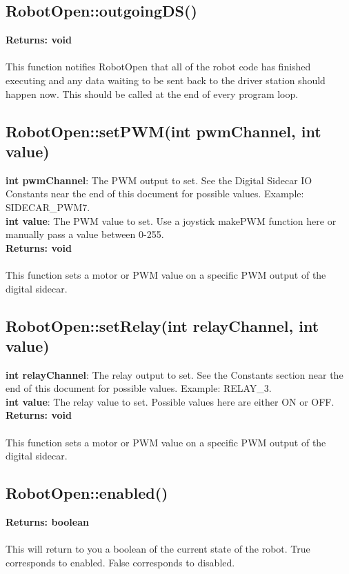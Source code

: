 \documentclass[11pt]{article} %
\begin{document}
\subsection{RobotOpen::outgoingDS()}
\textbf{Returns: void}\\\\
This function notifies RobotOpen that all of the robot code has finished executing and any data waiting to be sent back to the driver station should happen now. This should be called at the end of every program loop.
\subsection{RobotOpen::setPWM(int pwmChannel, int value)}
\textbf{int pwmChannel}: The PWM output to set. See the Digital Sidecar IO Constants near the end of this document for possible values. Example: SIDECAR\_PWM7.\\
\textbf{int value}: The PWM value to set. Use a joystick makePWM function here or manually pass a value between 0-255.\\
\textbf{Returns: void}\\\\
This function sets a motor or PWM value on a specific PWM output of the digital sidecar.
\subsection{RobotOpen::setRelay(int relayChannel, int value)}
\textbf{int relayChannel}: The relay output to set. See the Constants section near the end of this document for possible values. Example: RELAY\_3.\\
\textbf{int value}: The relay value to set. Possible values here are either ON or OFF.\\
\textbf{Returns: void}\\\\
This function sets a motor or PWM value on a specific PWM output of the digital sidecar.
\subsection{RobotOpen::enabled()}
\textbf{Returns: boolean}\\\\
This will return to you a boolean of the current state of the robot. True corresponds to enabled. False corresponds to disabled.
\end{document}
